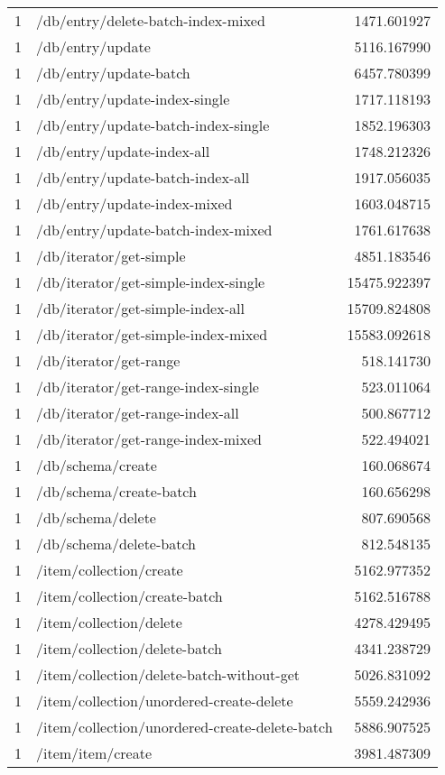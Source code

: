 \begin{longtable}{rlr}
1 & /db/entry/delete-batch-index-mixed & 1471.601927 \\
1 & /db/entry/update & 5116.167990 \\
1 & /db/entry/update-batch & 6457.780399 \\
1 & /db/entry/update-index-single & 1717.118193 \\
1 & /db/entry/update-batch-index-single & 1852.196303 \\
1 & /db/entry/update-index-all & 1748.212326 \\
1 & /db/entry/update-batch-index-all & 1917.056035 \\
1 & /db/entry/update-index-mixed & 1603.048715 \\
1 & /db/entry/update-batch-index-mixed & 1761.617638 \\
1 & /db/iterator/get-simple & 4851.183546 \\
1 & /db/iterator/get-simple-index-single & 15475.922397 \\
1 & /db/iterator/get-simple-index-all & 15709.824808 \\
1 & /db/iterator/get-simple-index-mixed & 15583.092618 \\
1 & /db/iterator/get-range & 518.141730 \\
1 & /db/iterator/get-range-index-single & 523.011064 \\
1 & /db/iterator/get-range-index-all & 500.867712 \\
1 & /db/iterator/get-range-index-mixed & 522.494021 \\
1 & /db/schema/create & 160.068674 \\
1 & /db/schema/create-batch & 160.656298 \\
1 & /db/schema/delete & 807.690568 \\
1 & /db/schema/delete-batch & 812.548135 \\
1 & /item/collection/create & 5162.977352 \\
1 & /item/collection/create-batch & 5162.516788 \\
1 & /item/collection/delete & 4278.429495 \\
1 & /item/collection/delete-batch & 4341.238729 \\
1 & /item/collection/delete-batch-without-get & 5026.831092 \\
1 & /item/collection/unordered-create-delete & 5559.242936 \\
1 & /item/collection/unordered-create-delete-batch & 5886.907525 \\
1 & /item/item/create & 3981.487309 \\

\end{longtable}
